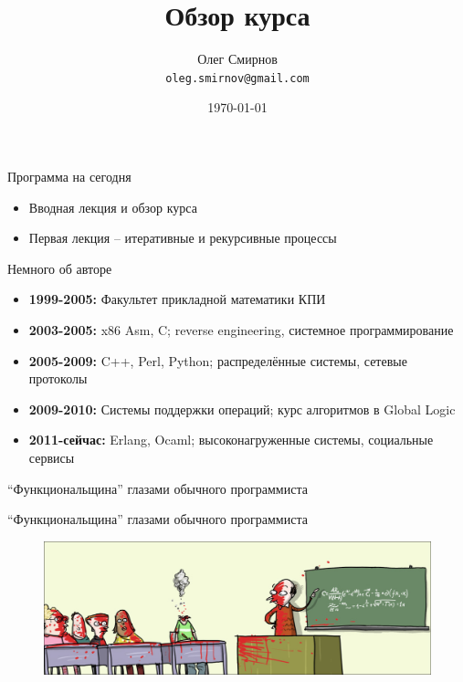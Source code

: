 \documentclass{beamer}
\title[Введение в функциональное программирование]{Обзор курса}
\author{Олег Смирнов\\
\texttt{oleg.smirnov@gmail.com}}
\institute{УНК ``ИПСА'' НТУУ ``КПИ''}
\date{\today}
\begin{document}
\begin{frame}
\titlepage
\end{frame}

\begin{frame}{Программа на сегодня}
  \begin{itemize}
    \item Вводная лекция и обзор курса
    \item Первая лекция -- итеративные и рекурсивные процессы
  \end{itemize}
\end{frame}

\begin{frame}{Немного об авторе}
  \begin{itemize}
  \item {\bf 1999-2005:} Факультет прикладной математики КПИ
  \item {\bf 2003-2005:} x86 Asm, C; reverse engineering, системное программирование
  \item {\bf 2005-2009:} C++, Perl, Python; распределённые системы, сетевые протоколы
  \item {\bf 2009-2010:} Системы поддержки операций; курс алгоритмов в Global Logic
  \item {\bf 2011-сейчас:} Erlang, Ocaml; высоконагруженные системы, социальные сервисы
  \end{itemize}
\end{frame}

\begin{frame}{``Функциональщина'' глазами обычного программиста}
  
\end{frame}

\begin{frame}{``Функциональщина'' глазами обычного программиста}
\begin{figure}
   \includegraphics[scale=0.44]{lecture0/Matematik-Hjerne-Formel-WM_strip_DK_20090625.eps}
\end{figure}
\end{frame}
\end{document}
